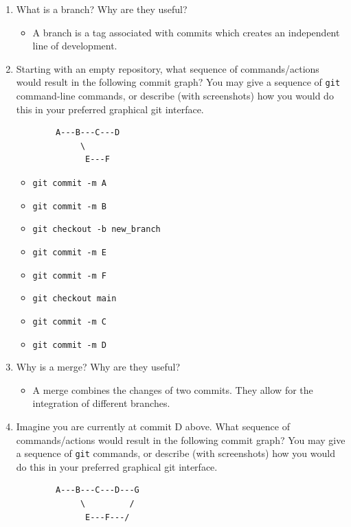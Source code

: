 \documentclass[10pt,twocolumn]{article}
\begin{document}
\begin{enumerate}
    \item What is a branch? Why are they useful?
        \begin{itemize}
            \item A branch is a tag associated with commits which creates an independent line of development.
        \end{itemize}
    \item Starting with an empty repository, what sequence of commands/actions would result in the following commit graph? You may give a sequence of \texttt{git} command-line commands, or describe (with screenshots) how you would do this in your preferred graphical git interface.
        \begin{verbatim}
        A---B---C---D
             \
              E---F
        \end{verbatim}
        \begin{itemize}
            \item \texttt{git commit -m A}
            \item \texttt{git commit -m B}
            \item \texttt{git checkout -b new\_branch}
            \item \texttt{git commit -m E}
            \item \texttt{git commit -m F}
            \item \texttt{git checkout main}
            \item \texttt{git commit -m C}
            \item \texttt{git commit -m D}
        \end{itemize}
    \item Why is a merge? Why are they useful?
        \begin{itemize}
            \item A merge combines the changes of two commits. They allow for the integration of different branches.
        \end{itemize}
    \item Imagine you are currently at commit D above. What sequence of commands/actions would result in the following commit graph? You may give a sequence of \texttt{git} commands, or describe (with screenshots) how you would do this in your preferred graphical git interface.
        \begin{verbatim}
        A---B---C---D---G
             \         /
              E---F---/
        \end{verbatim}

\end{enumerate}
\end{document}
